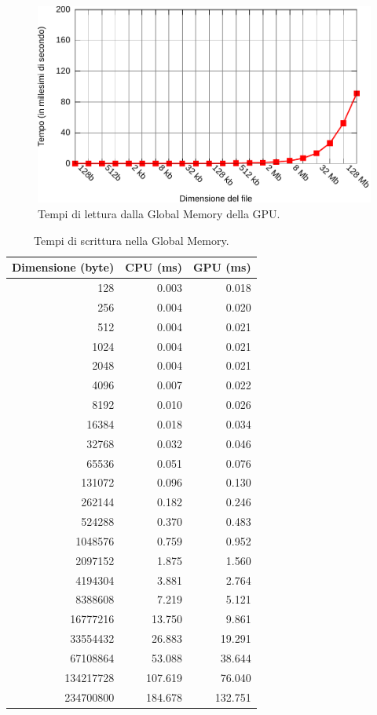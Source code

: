 \documentclass[12pt,a4paper,oneside]{book}
\begin{document}
\begin{figure}[p]
\begin{center}
\includegraphics[width=\textwidth]{img/test-read-gpu}
\caption{Tempi di lettura dalla Global Memory della GPU.\label{fig:test-read-gpu}}
\end{center}
\end{figure}

\begin{table}[p]
\begin{center}
\begin{tabular}{|r|r|r|}
\hline
\textbf{Dimensione (byte)} & \textbf{CPU (ms)} & \textbf{GPU (ms)} \\
\hline
128 & 0.003 & 0.018 \\
\hline
256 & 0.004 & 0.020 \\
\hline
512 & 0.004 & 0.021 \\
\hline
1024 & 0.004 & 0.021 \\
\hline
2048 & 0.004 & 0.021 \\
\hline
4096 & 0.007 & 0.022 \\
\hline
8192 & 0.010 & 0.026 \\
\hline
16384 & 0.018 & 0.034 \\
\hline
32768 & 0.032 & 0.046 \\
\hline
65536 & 0.051 & 0.076 \\
\hline
131072 & 0.096 & 0.130 \\
\hline
262144 & 0.182 & 0.246 \\
\hline
524288 & 0.370 & 0.483 \\
\hline
1048576 & 0.759 & 0.952 \\
\hline
2097152 & 1.875 & 1.560 \\
\hline
4194304 & 3.881 & 2.764 \\
\hline
8388608 & 7.219 & 5.121 \\
\hline
16777216 & 13.750 & 9.861 \\
\hline
33554432 & 26.883 & 19.291 \\
\hline
67108864 & 53.088 & 38.644 \\
\hline
134217728 & 107.619 & 76.040 \\
\hline
234700800 & 184.678 & 132.751 \\
\hline
\end{tabular}
\caption{Tempi di scrittura nella Global Memory.\label{tab:test-write}}
\end{center}
\end{table}
\end{document}
